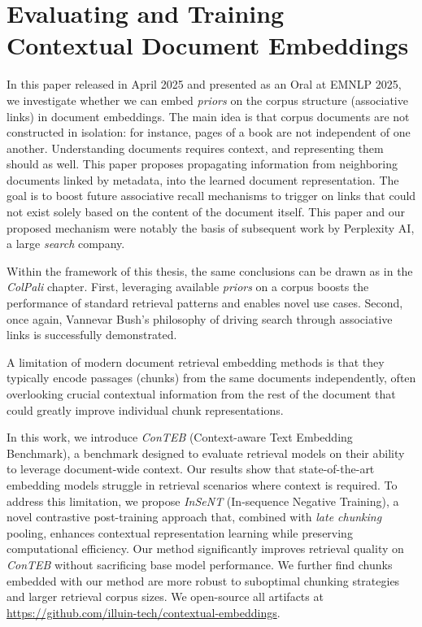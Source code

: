 \setchapterpreamble[u]{\margintoc}
\chapter{Evaluating and Training Contextual Document Embeddings}
\label{ch:conteb}

\begin{sagekaobox}[frametitle=Paper Context]
In this paper released in April 2025 and presented as an Oral at EMNLP 2025, we investigate whether we can embed \emph{priors} on the corpus structure (associative links) in document embeddings. The main idea is that corpus documents are not constructed in isolation: for instance, pages of a book are not independent of one another. Understanding documents requires context, and representing them should as well. This paper proposes propagating information from neighboring documents linked by metadata, into the learned document representation. The goal is to boost future associative recall mechanisms to trigger on links that could not exist solely based on the content of the document itself.
This paper and our proposed mechanism were notably the basis of subsequent work by Perplexity AI, a large \emph{search} company.

Within the framework of this thesis, the same conclusions can be drawn as in the \emph{ColPali} chapter. First, leveraging available \emph{priors} on a corpus boosts the performance of standard retrieval patterns and enables novel use cases. Second, once again, Vannevar Bush's philosophy of driving search through associative links is successfully demonstrated.
\end{sagekaobox}



\begin{kaobox}[frametitle=Paper Abstract]
A limitation of modern document retrieval embedding methods is that they typically encode passages (chunks) from the same documents independently, often overlooking crucial contextual information from the rest of the document that could greatly improve individual chunk representations.

In this work, we introduce \emph{ConTEB} (Context-aware Text Embedding Benchmark), a benchmark designed to evaluate retrieval models on their ability to leverage document-wide context. Our results show that state-of-the-art embedding models struggle in retrieval scenarios where context is required. To address this limitation, we propose \emph{InSeNT} (In-sequence Negative Training), a novel contrastive post-training approach that, combined with \textit{late chunking} pooling, enhances contextual representation learning while preserving computational efficiency. Our method significantly improves retrieval quality on \emph{ConTEB} without sacrificing base model performance.
We further find chunks embedded with our method are more robust to suboptimal chunking strategies and larger retrieval corpus sizes.
We open-source all artifacts at \url{https://github.com/illuin-tech/contextual-embeddings}. 
\end{kaobox}

